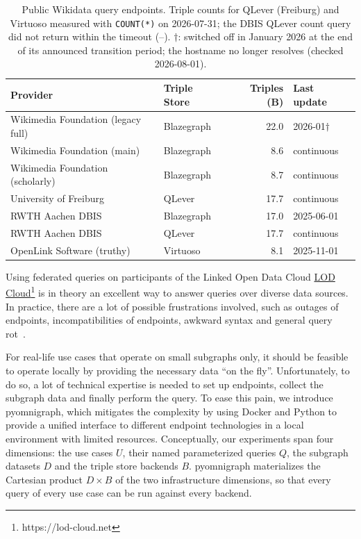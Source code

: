 \documentclass[
]{ceurart}
\newcommand{\tquote}[1]{``#1''}
\newcommand{\footnotelink}[2]{\href{#1}{#2}\footnote{#1}}
\begin{document}
\begin{table}
\caption{Public Wikidata query endpoints. Triple counts for QLever (Freiburg)
and Virtuoso measured with \texttt{COUNT(*)} on 2026-07-31; the DBIS QLever
count query did not return within the timeout (--).
$\dag$: switched off in January 2026 at the end of its announced transition
period; the hostname no longer resolves (checked 2026-08-01).}
\label{tab:PublicEndpoints}
\begin{tabular}{llrl}
\hline
Provider & Triple Store & Triples (B) & Last update \\
\hline
Wikimedia Foundation (legacy full) & Blazegraph & 22.0 & 2026-01$\dag$ \\
Wikimedia Foundation (main)        & Blazegraph &  8.6 & continuous \\
Wikimedia Foundation (scholarly)   & Blazegraph &  8.7 & continuous \\
University of Freiburg             & QLever     & 17.7 & continuous \\
RWTH Aachen DBIS                   & Blazegraph & 17.0 & 2025-06-01 \\
RWTH Aachen DBIS                   & QLever     & 17.7 & continuous \\
OpenLink Software (truthy)         & Virtuoso   &  8.1 & 2025-11-01 \\
\hline
\end{tabular}
\end{table}

Using federated queries on participants of the Linked Open Data Cloud \footnotelink{https://lod-cloud.net}{LOD Cloud} is in theory an excellent way to answer queries over diverse data sources. In practice, there are a lot of possible frustrations involved, such as outages of endpoints, incompatibilities of endpoints, awkward syntax and general query rot~\cite{fahl_snapquery_2026}.

For real-life use cases that operate on small subgraphs only, it should be feasible to operate locally by providing the necessary data \tquote{on the fly}. Unfortunately, to do so, a lot of technical expertise is needed to set up endpoints, collect the subgraph data and finally perform the query. 
To ease this pain, we introduce pyomnigraph, which mitigates the complexity by using Docker and Python to provide a unified interface to different endpoint technologies in a local environment with limited resources.
Conceptually, our experiments span four dimensions: the use cases $U$, their named parameterized queries $Q$, the subgraph datasets $D$ and the triple store backends $B$. pyomnigraph materializes the Cartesian product $D \times B$ of the two infrastructure dimensions, so that every query of every use case can be run against every backend.
\end{document}
